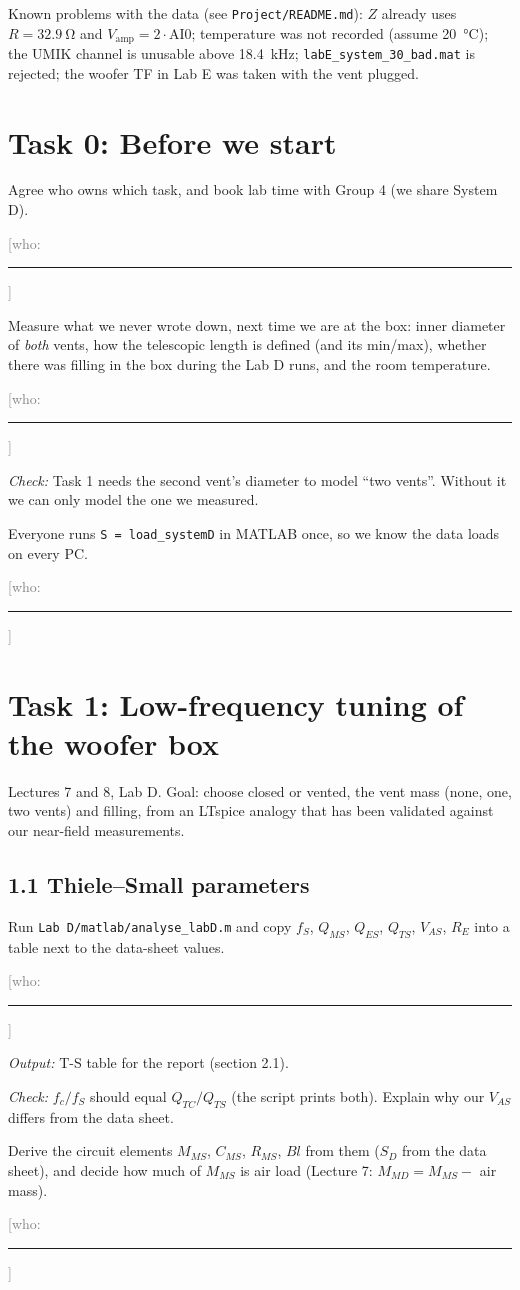 \documentclass[a4paper,10pt]{article}
\newcommand{\file}[1]{\nolinkurl{#1}}
\newcommand{\who}{\textcolor{gray}{[who: \rule{1.6cm}{0.4pt}]}}
\newcommand{\out}[1]{\par\hspace*{1.2em}\textit{Output:} #1}
\newcommand{\chk}[1]{\par\hspace*{1.2em}\textit{Check:} #1}
\begin{document}
Known problems with the data (see \file{Project/README.md}): $Z$ already uses $R = \SI{32.9}{\ohm}$
and $V_\text{amp} = 2\cdot\text{AI0}$; temperature was not recorded (assume \SI{20}{\celsius});
the UMIK channel is unusable above \SI{18.4}{kHz}; \file{labE_system_30_bad.mat} is rejected;
the woofer TF in Lab E was taken with the vent plugged.

\section*{Task 0: Before we start}
\begin{todo}
\item Agree who owns which task, and book lab time with Group 4 (we share System D). \who
\item Measure what we never wrote down, next time we are at the box: inner diameter of
  \emph{both} vents, how the telescopic length is defined (and its min/max), whether there was
  filling in the box during the Lab D runs, and the room temperature. \who
  \chk{Task 1 needs the second vent's diameter to model ``two vents''. Without it we can only
  model the one we measured.}
\item Everyone runs \file{S = load_systemD} in MATLAB once, so we know the data loads on every PC. \who
\end{todo}

\section*{Task 1: Low-frequency tuning of the woofer box}
Lectures 7 and 8, Lab D. Goal: choose closed or vented, the vent mass (none, one, two vents) and
filling, from an LTspice analogy that has been validated against our near-field measurements.

\subsection*{1.1 Thiele--Small parameters}
\begin{todo}
\item Run \file{Lab D/matlab/analyse_labD.m} and copy $f_S$, $Q_{MS}$, $Q_{ES}$, $Q_{TS}$,
  $V_{AS}$, $R_E$ into a table next to the data-sheet values. \who
  \out{T-S table for the report (section 2.1).}
  \chk{$f_c/f_S$ should equal $Q_{TC}/Q_{TS}$ (the script prints both). Explain why our
  $V_{AS}$ differs from the data sheet.}
\item Derive the circuit elements $M_{MS}$, $C_{MS}$, $R_{MS}$, $Bl$ from them ($S_D$ from the
  data sheet), and decide how much of $M_{MS}$ is air load (Lecture 7: $M_{MD} = M_{MS} - $ air
  mass). \who
\end{todo}
\end{document}
